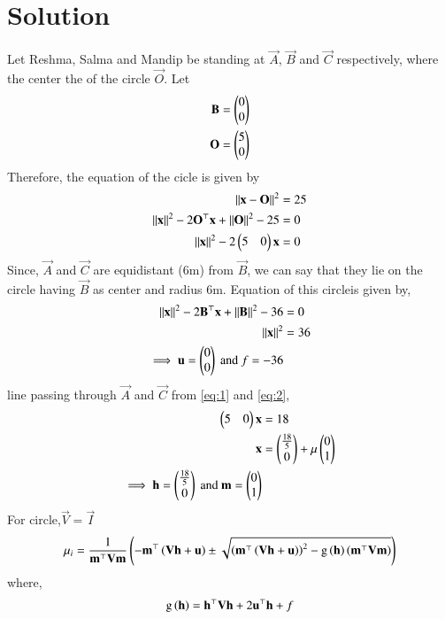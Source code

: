 \documentclass[A4,11pt,twocolumn]{IEEEtran}
\begin{document}
\section{Solution}
Let Reshma, Salma and Mandip be standing at $\vec{A}$, $\vec{B}$ and $\vec{C}$ respectively, where the center the of the circle $\vec{O}$.
Let 
\begin{align}
\mathbf{B} &= \begin{pmatrix}0\\0\end{pmatrix}\\
\mathbf{O} &= \begin{pmatrix}5\\0\end{pmatrix}
\end{align}
Therefore, the equation of the cicle is given by 
\begin{align}
\left\lVert\mathbf{x}-\mathbf{O}\right\rVert^2 &= 25\\
\left\lVert\mathbf{x}\right\rVert^2 - 2 \mathbf{O}^{\top}\mathbf{x} + \left\lVert\mathbf{O}\right\rVert^2 - 25 &= 0\\
\left\lVert\mathbf{x}\right\rVert^2 - 2 \begin{pmatrix}5 & 0\end{pmatrix}\mathbf{x} &= 0
\label{eq:1}
\end{align}
Since, $\vec{A}$ and $\vec{C}$ are equidistant (6m) from $\vec{B}$, we can say that they lie on the circle having $\vec{B}$ as center and radius 6m.
Equation of this circleis given by,
\begin{align}
\left\lVert\mathbf{x}\right\rVert^2 - 2\mathbf{B}^{\top} \mathbf{x} + \left\lVert\mathbf{B}\right\rVert^2 - 36 &= 0\\
\left\lVert\mathbf{x}\right\rVert^2 &= 36\\
\implies \mathbf{u} = \begin{pmatrix}0\\0\end{pmatrix} \ \text{and} \ f = -36
\label{eq:2}
\end{align}
line passing through $\vec{A}$ and $\vec{C}$ from \eqref{eq:1} and \eqref{eq:2},
\begin{align}
\begin{pmatrix}5&0\end{pmatrix} \mathbf{x} &= 18\\
\mathbf{x} &= \begin{pmatrix}\frac{18}{5}\\[1pt] 0\end{pmatrix} + \mu \begin{pmatrix}0\\1\end{pmatrix}\\
\implies \mathbf{h} = \begin{pmatrix}\frac{18}{5}\\[1pt] 0\end{pmatrix} \ \text{and} \ \mathbf{m} = \begin{pmatrix}0\\1\end{pmatrix}
\end{align}
For circle,$\vec{V} = \vec{I}$
\begin{multline}
 \mu_i = \frac{1}{ \mathbf{m}^{\top}\mathbf{V}\mathbf{m}} \left(\mathbf{-m}^{\top}\left(\mathbf{V}\mathbf{h}+\mathbf{u}\right) \pm   \sqrt{\left(\mathbf{m}^{\top}\left(\mathbf{V}\mathbf{h}+\mathbf{u}\right)\right)^2 - \text{g}\left(\mathbf{h}\right)\left(\mathbf{m}^{\top} \mathbf{V}\mathbf{m}\right)}\right)
\end{multline}
where,
\begin{align}
\text{g}\left(\mathbf{h}\right) = \mathbf{h}^{\top}\mathbf{V}\mathbf{h} + 2\mathbf{u}^{\top}\mathbf{h} +f
\end{align}
\end{document}
